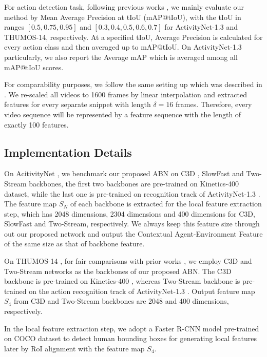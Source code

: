\documentclass{ieeeaccess}
\begin{document}
For action detection task, following previous works \cite{bmn, lin2018bsn}, we mainly evaluate our method by Mean Average Precision at tIoU (mAP@tIoU), with the tIoU in ranges $[0.5, 0.75, 0.95]$ and $[0.3, 0.4, 0.5, 0.6, 0.7]$ for ActivityNet-1.3 and THUMOS-14, respectively. At a specified tIoU, Average Precision is calculated for every action class and then averaged up to mAP@tIoU. On ActivityNet-1.3 particularly, we also report the Average mAP which is averaged among all mAP@tIoU scores.

For comparability purposes, we follow the same setting up which was described in \cite{bmn}. We re-scaled all videos to 1600 frames by linear interpolation and extracted features for every separate snippet with length $\delta = 16$ frames. Therefore, every video sequence will be represented by a feature sequence with the length of exactly 100 features.



\subsection{Implementation Details}
On AcitivityNet \cite{caba2015activitynet}, we benchmark our proposed ABN on C3D \cite{C3D_3}, SlowFast \cite{SlowFast} and Two-Stream \cite{2_stream_2} backbones, the first two backbones are pre-trained on Kinetics-400 \cite{Kinetics} dataset, while the last one is pre-trained on recognition track of ActivityNet-1.3 \cite{caba2015activitynet}. The feature map $S_N$ of each backbone is extracted for the local feature extraction step, which has 2048 dimensions, 2304 dimensions and 400 dimensions for C3D, SlowFast and Two-Stream, respectively. We always keep this feature size through out our proposed network and output the Contextual Agent-Environment Feature of the same size as that of backbone feature.

On THUMOS-14 \cite{THUMOS14}, for fair comparisons with prior works \cite{lin2018bsn, bmn, dbg}, we employ C3D \cite{C3D_3} and Two-Stream \cite{2_stream_2} networks as the backbones of our proposed ABN. The C3D \cite{C3D_3} backbone is pre-trained on Kinetics-400 \cite{Kinetics}, whereas Two-Stream backbone is pre-trained on the action recognition track of ActivityNet-1.3 \cite{caba2015activitynet}. Output feature map $S_4$ from C3D and Two-Stream backbones are 2048 and 400 dimensions, respectively.

In the local feature extraction step, we adopt a Faster R-CNN \cite{FasterRCNN} model pre-trained on COCO dataset \cite{cocodataset} to detect human bounding boxes for generating local features later by RoI alignment with the feature map $S_4$.
\end{document}
